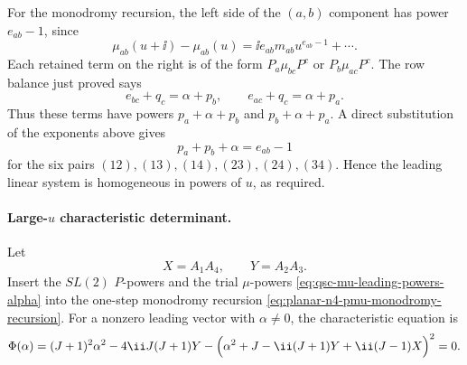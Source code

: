 For the monodromy recursion, the left side of the \((a,b)\) component has
power \(e_{ab}-1\), since
\[
  \mu_{ab}(u+\ii)-\mu_{ab}(u)
  =
  \ii e_{ab}m_{ab}u^{e_{ab}-1}+\cdots .
\]
Each retained term on the right is of the form
\(P_a\mu_{bc}P^c\) or \(P_b\mu_{ac}P^c\).  The row balance just proved says
\[
  e_{bc}+q_c=\alpha+p_b,\qquad
  e_{ac}+q_c=\alpha+p_a .
\]
Thus these terms have powers \(p_a+\alpha+p_b\) and \(p_b+\alpha+p_a\).
A direct substitution of the exponents above gives
\[
  p_a+p_b+\alpha=e_{ab}-1
\]
for the six pairs \((12),(13),(14),(23),(24),(34)\).  Hence the leading
linear system is homogeneous in powers of \(u\), as required.

\paragraph{Large-\(u\) characteristic determinant.}
Let
\[
  X=A_1A_4,\qquad Y=A_2A_3 .
\]
Insert the \(SL(2)\) \(P\)-powers and the trial \(\mu\)-powers
\eqref{eq:qsc-mu-leading-powers-alpha} into the one-step monodromy recursion
\eqref{eq:planar-n4-pmu-monodromy-recursion}.  For a nonzero leading vector
with \(\alpha\neq0\), the characteristic equation is
\begin{equation}
  \Phi(\alpha)
  =
  (J+1)^2\alpha^2
  -4\ii J(J+1)Y
  -
  \Bigl(
    \alpha^2+J-\ii(J+1)Y+\ii(J-1)X
  \Bigr)^2
  =
  0 .
  \label{eq:qsc-large-u-characteristic-polynomial}
\end{equation}

